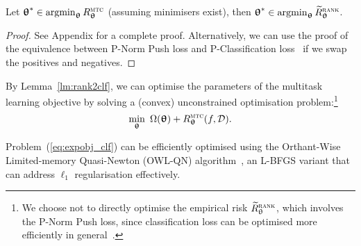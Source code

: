 
\begin{lemma}
\label{lm:rank2clf}
Let ${\bm{\uptheta}}^* \in \operatorname*{argmin}_{{\bm{\uptheta}}} R_{{\bm{\uptheta}}}^{\textsc{mtc}}$ (assuming minimisers exist),
then ${\bm{\uptheta}}^* \in \operatorname*{argmin}_{{\bm{\uptheta}}} \widetilde R_{{\bm{\uptheta}}}^{\textsc{rank}}$.
\end{lemma}

\begin{proof}
See Appendix for a complete proof.
Alternatively, 
we can use the proof of the equivalence between P-Norm Push loss and P-Classification loss~\cite{ertekin2011equivalence}
if we swap the positives and negatives.
\end{proof}


By Lemma~\ref{lm:rank2clf}, %
we can optimise the parameters of the multitask learning objective by 
solving a (convex) unconstrained optimisation problem:\footnote{We choose not to directly optimise 
the empirical risk $\widetilde R_{\uptheta}^{\textsc{rank}}$, which involves the P-Norm Push loss, %
since classification loss can be optimised more efficiently in general~\cite{ertekin2011equivalence}.}
\begin{equation}
\label{eq:expobj_clf}
\min_{\bm{\uptheta}} \ \Omega({\bm{\uptheta}}) + R_{{\bm{\uptheta}}}^{\textsc{mtc}}(f, \mathcal{D}).
\end{equation}

Problem~(\ref{eq:expobj_clf}) can be efficiently optimised using the
Orthant-Wise Limited-memory Quasi-Newton (OWL-QN) algorithm~\cite{andrew2007scalable},
an L-BFGS variant that can address $\ell_1$ regularisation effectively.

